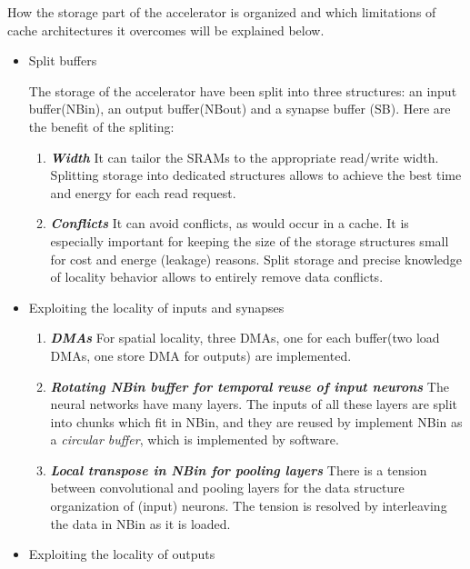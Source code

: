 \documentclass[10pt]{article}
\begin{document}
    How the storage part of the accelerator is organized and which
    limitations of cache architectures it overcomes will be explained
    below.
    \begin{itemize}
        \item Split buffers
        
        The storage of the accelerator have been split into three 
        structures: an input buffer(NBin), an output buffer(NBout) and
        a synapse buffer (SB).
        Here are the benefit of the spliting:
        \begin{enumerate}
            \item \textbf{\emph{Width}} 
            It can tailor the SRAMs to the appropriate read/write
            width. Splitting storage into dedicated structures allows
            to achieve the best time and energy for each read request.
            \item \textbf{\emph{Conflicts}}
            It can avoid conflicts, as would occur in a cache. It is
            especially important for keeping the size of the storage
            structures small for cost and energe (leakage) reasons.
            Split storage and precise knowledge of locality behavior
            allows to entirely remove data conflicts.
        \end{enumerate}
        \item Exploiting the locality of inputs and synapses
        \begin{enumerate}
            \item \textbf{\emph{DMAs}}
            For spatial locality, three DMAs, one for each buffer(two
            load DMAs, one store DMA for outputs) are implemented.
            \item \textbf{\emph{Rotating NBin buffer for temporal reuse of
            input neurons}}
            The neural networks have many layers. The inputs of all
            these layers are split into chunks which fit in NBin, and 
            they are reused by implement NBin as a \emph{circular 
            buffer}, which is implemented by software. 
            \item \textbf{\emph{Local transpose in NBin for pooling layers}}
            There is a tension between convolutional and pooling layers for
            the data structure organization of (input) neurons. The tension
            is resolved by interleaving the data in NBin as it is loaded.
        \end{enumerate}
        \item Exploiting the locality of outputs


\end{itemize}
\end{document}

